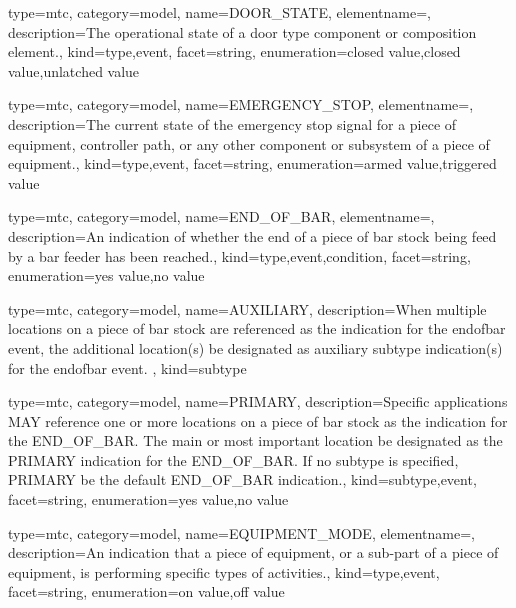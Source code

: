 {
  type=mtc,
  category=model,
  name={DOOR\_STATE},
  elementname=,
  description={The operational state of a \gls{door} type component or composition element.},
  kind={type,event},
  facet={\gls{string}},
  enumeration={\gls{closed value},\gls{closed value},\gls{unlatched value}}
}


{
  type=mtc,
  category=model,
  name={EMERGENCY\_STOP},
  elementname=,
  description={The current state of the emergency stop signal for a piece of equipment, controller path, or any other component or subsystem of a piece of equipment.},
  kind={type,event},
  facet={\gls{string}},
  enumeration={\gls{armed value},\gls{triggered value}}
}


{
  type=mtc,
  category=model,
  name={END\_OF\_BAR},
  elementname=,
  description={An indication of whether the end of a piece of bar stock being feed by a bar feeder has been reached.},
  kind={type,event,condition},
  facet={\gls{string}},
  enumeration={\gls{yes value},\gls{no value}}
}


{
  type=mtc,
  category=model,
  name={AUXILIARY},
  description={When multiple locations on a piece of bar stock are referenced as the indication for the \gls{endofbar event}, the additional location(s) \must be designated as \gls{auxiliary subtype} indication(s) for the \gls{endofbar event}.  },
  kind={subtype}
}


{
  type=mtc,
  category=model,
  name={PRIMARY},
  description={Specific applications MAY reference one or more locations on a piece of bar stock as the indication for the END\_OF\_BAR.  The main or most important location \must be designated as the PRIMARY indication for the END\_OF\_BAR.   \newline If no \gls{subtype} is specified, PRIMARY \must be the default END\_OF\_BAR indication.},
  kind={subtype,event},
  facet={\gls{string}},
  enumeration={\gls{yes value},\gls{no value}}
}


{
  type=mtc,
  category=model,
  name={EQUIPMENT\_MODE},
  elementname=,
  description={An indication that a piece of equipment, or a sub-part of a piece of equipment, is performing specific types of activities.},
  kind={type,event},
  facet={\gls{string}},
  enumeration={\gls{on value},\gls{off value}}
}


